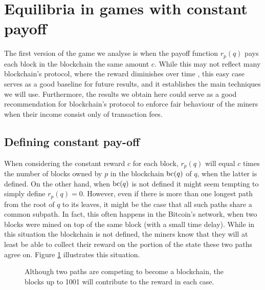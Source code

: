 

\section{Equilibria in games with constant payoff}
\label{sec-const_rew}

The first version of the game we analyse is when the payoff function $r_p(q)$ pays each block in the blockchain the same amount $c$. While this may not reflect many blockchain's protocol, where the reward diminishes over time \cite{bitcoin,ethernum,others}, this easy case serves as a good baseline for future results, and it establishes the main techniques we will use. Furthermore, the results we obtain here could serve as a good recommendation for blockchain's protocol to enforce fair behaviour of the miners when their income consist only of transaction fees.

\subsection{Defining constant pay-off}
When considering the constant reward $c$ for each block, $r_p(q)$ will equal $c$ times the number of blocks owned by $p$ in the blockchain $\text{bc}(q)$ of $q$, when the latter is defined. On the other hand, when $\text{bc}(q)$ is not defined it might seem tempting to simply define $r_p(q) = 0$. However, even if there is more than one longest path from the root of $q$ to its leaves, it might be the case that all such paths share a common subpath. In fact, this often happens in the Bitcoin's network, when two blocks were mined on top of the same block (with a small time delay). While in this situation the blockchain is not defined, the miners know that they will at least be able to collect their reward on the portion of the state these two paths agree on. Figure \ref{fig-simple-fork} illustrates this situation. 

\begin{figure}
\begin{center}
\end{center}
\caption{Although two paths are competing to become a blockchain, the blocks up to 1001 will contribute to the reward in each case. \label{fig-simple-fork}}
\end{figure}

